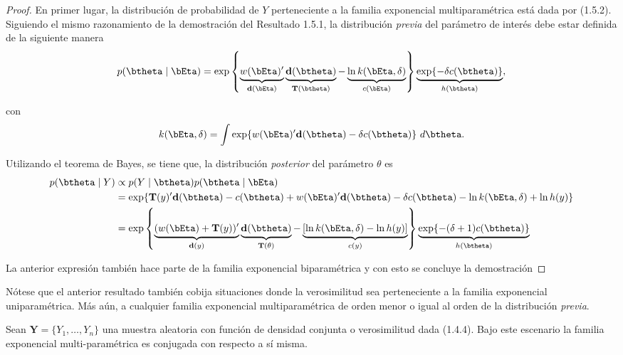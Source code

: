 \documentclass[10pt,openright]{book}\usepackage[]{graphicx}\usepackage[]{color}
\begin{document}
\begin{proof}
En primer lugar, la distribución de probabilidad de $Y$ perteneciente a la familia exponencial  multiparamétrica está dada por (1.5.2). Siguiendo el mismo razonamiento de la demostración del Resultado 1.5.1, la distribución \emph{previa} del parámetro de interés debe estar definida de la siguiente manera
\begin{equation}
p(\btheta \mid \bEta)=\exp\left\{\underbrace{w(\bEta)'}_{\mathbf{d}(\bEta)}
\underbrace{\mathbf{d}(\btheta)}_{\mathbf{T}(\btheta)} - \underbrace{\ln k(\bEta,\delta)}_{c(\bEta)}\right\}\underbrace{\exp\{-\delta c(\btheta)\}}_{h(\btheta)},
\end{equation}

con
\begin{equation*}
k(\bEta,\delta)=\int\exp\{w(\bEta)'\mathbf{d}(\btheta)-\delta c(\btheta)\} \ d\btheta.
\end{equation*}

Utilizando el teorema de Bayes, se tiene que, la distribución \emph{posterior} del parámetro $\theta$ es
\begin{align*}
p(\btheta \mid Y) &\propto p(Y \mid \btheta)p(\btheta \mid \bEta)\\
&= \exp\{\mathbf{T}(y)'\mathbf{d}(\btheta) - c(\btheta) + w(\bEta)' \mathbf{d}(\btheta) - \delta c(\btheta) - \ln k(\bEta,\delta) +\ln h(y)\}\\
& =
\exp\left\{\underbrace{(w(\bEta)+\mathbf{T}(y))'}_{\mathbf{d}(y)}
\underbrace{\mathbf{d}(\btheta)}_{\mathbf{T}(\theta)} - \underbrace{\left[\ln k(\bEta,\delta)-\ln h(y)\right]}_{c(y)}\right\}\underbrace{\exp\{-(\delta+1)c(\btheta)\}}_{h(\btheta)}
\end{align*}

La anterior expresión también hace parte de la familia exponencial biparamétrica y con esto se concluye la demostración
\end{proof}

Nótese que el anterior resultado también cobija situaciones donde la verosimilitud sea perteneciente a la familia exponencial uniparamétrica. Más aún, a cualquier familia exponencial multiparamétrica de orden menor o igual al orden de la distribución \emph{previa}.

\begin{Res}
Sean $\mathbf{Y}=\{Y_1, \ldots, Y_n\}$ una muestra aleatoria con función de densidad conjunta o verosimilitud dada (1.4.4). Bajo este escenario la familia exponencial multi-paramétrica es conjugada con respecto a sí misma.
\end{Res}
\end{document}
